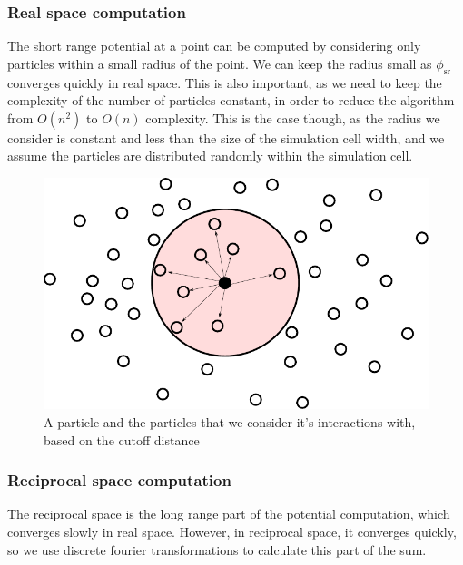 \documentclass[pdftex,twoside,a4paper]{report}
\newcommand{\bcen}{\begin{center}}
\newcommand{\ecen}{\end{center}}
\begin{document}
\subsubsection{Real space computation}
The short range potential at a point can be computed by considering only particles within a small radius of the point. We can keep the radius small as $\phi_{\text{sr}}$ converges quickly in real space. This is also important, as we need to keep the complexity of the number of particles constant, in order to reduce the algorithm from $O(n^2)$ to $O(n)$ complexity. This is the case though, as the radius we consider is constant and less than the size of the simulation cell width, and we assume the particles are distributed randomly within the simulation cell.
\begin{figure}
\bcen \includegraphics{figures/cutoff.pdf} \ecen
\caption{A particle and the particles that we consider it's interactions with, based on the cutoff distance}
\end{figure}

\subsubsection{Reciprocal space computation}
The reciprocal space is the long range part of the potential computation, which converges slowly in real space. However, in reciprocal space, it converges quickly, so we use discrete fourier transformations to calculate this part of the sum.\\
\end{document}

